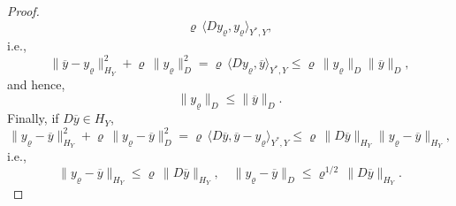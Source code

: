 \documentclass[10pt,a4paper]{amsart}
\begin{document}
\begin{proof}
\[    \varrho \, \langle D y_\varrho , y_\varrho \rangle_{Y^*,Y},
  \]
  i.e.,
  \[
    \| \overline{y} - y_\varrho \|^2_{H_Y}
    +
    \varrho \, \| y_\varrho \|^2_D
    =
    \varrho \, \langle D y_\varrho , \overline{y} \rangle_{Y^*,Y}
    \leq \varrho \, \| y_\varrho \|_D \| \overline{y} \|_D ,
  \]
  and hence,
  \[
    \| y_\varrho \|_D \leq \| \overline{y} \|_D .
  \]
  Finally, if $D \overline{y} \in H_Y$,
  \[
    \| y_\varrho - \overline{y} \|_{H_Y}^2 + \varrho \,
    \| y_\varrho - \overline{y} \|_D^2 =
    \varrho \, \langle D \overline{y} , \overline{y} - y_\varrho \rangle_{Y^*,Y}
    \leq \varrho \, \| D \overline{y} \|_{H_Y}
    \| y_\varrho - \overline{y} \|_{H_Y},
  \]
  i.e.,
  \[
    \| y_\varrho - \overline{y} \|_{H_Y} \leq
    \varrho \, \| D \overline{y} \|_{H_Y}, \quad
    \| y_\varrho - \overline{y} \|_D \leq \varrho^{1/2} \,
    \| D \overline{y} \|_{H_Y} .
  \]
\end{proof}
\end{document}

